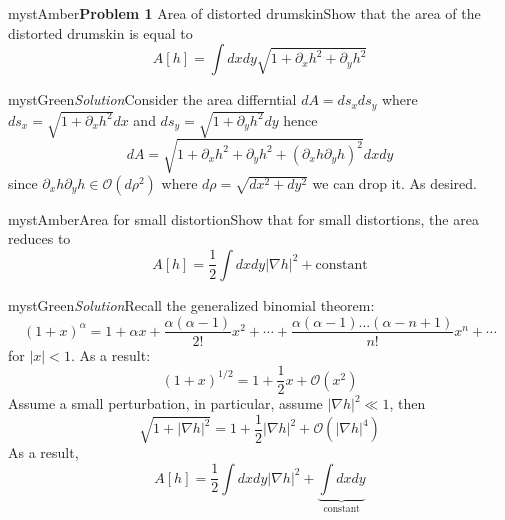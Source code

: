 \begin{mystadmonition}{mystAmber}{\textbf{Problem 1} Area of distorted drumskin}Show that the area of the distorted drumskin is equal to
\begin{equation}
A[h] = \int dxdy \sqrt{1 + \partial_x h^2 + \partial_y h^2}
\end{equation}

\end{mystadmonition}
\begin{mystadmonition}{mystGreen}{\emph{Solution}}Consider the area differntial $dA=ds_x ds_y$ where $ds_x=\sqrt{1+\partial_x h^2}dx$ and $ds_y=\sqrt{1+\partial_y h^2}dy$ hence
\begin{equation}
dA=\sqrt{1+\partial_x h^2 + \partial_y h^2 + (\partial_x h\partial_y h)^2}dxdy
\end{equation}
since $\partial_x h\partial_y h\in \mathcal{O}(d\rho^2)$ where $d\rho = \sqrt{dx^2 + dy^2}$ we can drop it. As desired.

\end{mystadmonition}
\begin{mystadmonition}{mystAmber}{Area for small distortion}Show that for small distortions, the area reduces to
\begin{equation}
\label{afsd}
   A[h]=\frac{1}{2}\int dxdy |\nabla h|^2 + \text{constant}
\end{equation}

\end{mystadmonition}
\begin{mystadmonition}{mystGreen}{\emph{Solution}}Recall the generalized binomial theorem:
\begin{equation}
(1+x)^{\alpha}=1+\alpha x + \frac{\alpha(\alpha-1)}{2!}x^2+\cdots + \frac{\alpha(\alpha-1)...(\alpha-n+1)}{n!}x^n + \cdots
\end{equation}
for $|x|<1$.
As a result:
\begin{equation}
(1+x)^{1/2}=1+\frac12 x + \mathcal{O}(x^2)
\end{equation}
Assume a small perturbation, in particular, assume $|\nabla h|^2 \ll 1$, then
\begin{equation}
\sqrt{1+|\nabla h|^2} = 1 + \frac12 |\nabla h|^2 +  \mathcal{O}(|\nabla h|^4)
\end{equation}
As a result,
\begin{equation}
A[h]=\frac12 \int dxdy |\nabla h|^2 + \underbrace{\int dxdy}_{\text{constant}}
\end{equation}

\end{mystadmonition}
